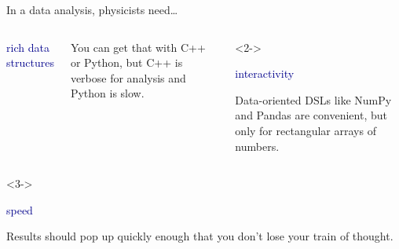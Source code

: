 \documentclass[aspectratio=169]{beamer}
\begin{document}

\begin{frame}{In a data analysis, physicists need\ldots}
\Large
\vspace{-0.5 cm}

\begin{columns}[t]
\begin{center}
\textcolor{darkblue}{\LARGE rich data structures}
\end{center}

\vspace{-0.2 cm}
You can get that with C++ or Python, but C++ is verbose for analysis and Python is slow.

\begin{uncoverenv}<2->
\begin{center}
\textcolor{darkblue}{\LARGE interactivity}
\end{center}

\vspace{-0.2 cm}
Data-oriented DSLs like NumPy and Pandas are convenient, but only for rectangular arrays of numbers.
\end{uncoverenv}
\end{columns}

\vspace{0.25 cm}
\begin{columns}
\begin{uncoverenv}<3->
\begin{center}
\textcolor{darkblue}{\LARGE speed}
\end{center}

\vspace{-0.2 cm}
Results should pop up quickly enough that you don't lose your train of thought.
\end{uncoverenv}
\end{columns}
\end{frame}
\end{document}
